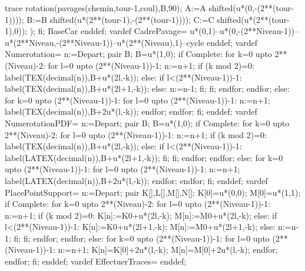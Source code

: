 {      trace rotation(pavages(chemin,tour-1,coul),B,90);
      A:=A shifted(u*(0,-(2**(tour-1))));
      B:=B shifted(u*(2**(tour-1),-(2**(tour-1))));
      C:=C shifted(u*(2**(tour-1),0));
      );
  fi;
  BaseCar
  enddef;
  vardef CadrePavage=
  u*(0,1)--u*(0,-(2**Niveau-1))--u*(2**Niveau,-(2**Niveau-1))--u*(2**(Niveau),1)--cycle
  enddef;
  vardef Numerotation=
  n:=Depart;
  pair B;
  B=u*(1,0);
  if Complete:
  for k=0 upto 2**(Niveau)-2:
  for l=0 upto (2**(Niveau-1))-1:
  n:=n+1;
  if (k mod 2)=0:
  label(TEX(decimal(n)),B+u*(2l,-k));
  else:
  if l<(2**(Niveau-1))-1:
  label(TEX(decimal(n)),B+u*(2l+1,-k));
  else:
  n:=n-1;
  fi;
  fi;
  endfor;
  endfor;
  else:
  for k=0 upto (2**(Niveau-1))-1:
  for l=0 upto (2**(Niveau-1))-1:
  n:=n+1;
  label(TEX(decimal(n)),B+2u*(l,-k));
  endfor;
  endfor;
  fi;
  enddef;
  vardef NumerotationPDF=
  n:=Depart;
  pair B;
  B=u*(1,0);
  if Complete:
  for k=0 upto 2**(Niveau)-2:
  for l=0 upto (2**(Niveau-1))-1:
  n:=n+1;
  if (k mod 2)=0:
  label(TEX(decimal(n)),B+u*(2l,-k));
  else:
  if l<(2**(Niveau-1))-1:
  label(LATEX(decimal(n)),B+u*(2l+1,-k));
  fi;
  fi;
  endfor;
  endfor;
  else:
  for k=0 upto (2**(Niveau-1))-1:
  for l=0 upto (2**(Niveau-1))-1:
  n:=n+1;
  label(LATEX(decimal(n)),B+2u*(l,-k));
  endfor;
  endfor;
  fi;
  enddef;
  vardef PlacePointSupport=
  n:=Depart;
  pair K[],L[],M[],N[];
  K[0]=u*(0,0);
  M[0]=u*(1,1);
  if Complete:
  for k=0 upto 2**(Niveau)-2:
  for l=0 upto (2**(Niveau-1))-1:
  n:=n+1;
  if (k mod 2)=0:
  K[n]:=K0+u*(2l,-k);
  M[n]:=M0+u*(2l,-k);
  else:
  if l<(2**(Niveau-1))-1:
  K[n]:=K0+u*(2l+1,-k);
  M[n]:=M0+u*(2l+1,-k);
  else:
  n:=n-1;
  fi;
  fi;
  endfor;
  endfor;
  else:
  for k=0 upto (2**(Niveau-1))-1:
  for l=0 upto (2**(Niveau-1))-1:
  n:=n+1;
  K[n]=K[0]+2u*(l,-k);
  M[n]=M[0]+2u*(l,-k);
  endfor;
  endfor;
  fi;
  enddef;
  vardef EffectuerTraces=
  enddef;
}%

